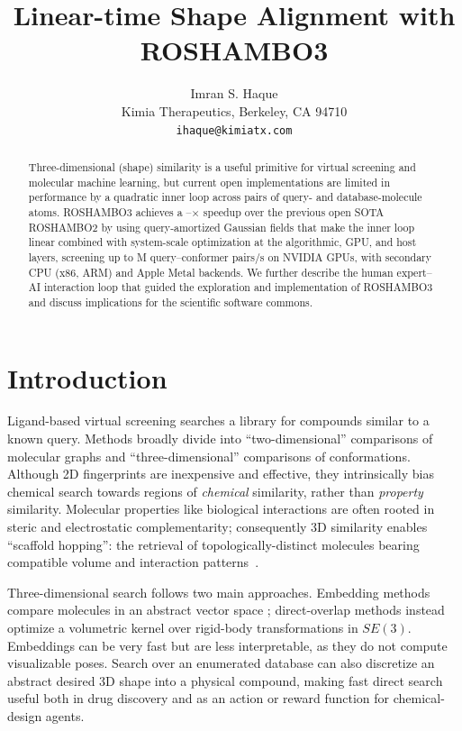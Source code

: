 \documentclass{article}
\title{Linear-time Shape Alignment with ROSHAMBO3}
\author{Imran S. Haque\\
Kimia Therapeutics, Berkeley, CA 94710\\
\texttt{ihaque@kimiatx.com}}
\newcommand{\method}{ROSHAMBO3}
\begin{document}
\maketitle
\vspace{-18pt}
\begin{abstract}
\vspace{-2pt}
    Three-dimensional (shape) similarity is a useful primitive for virtual screening
    and molecular machine learning, but current open implementations are limited in performance
    by a quadratic inner loop across pairs of query- and database-molecule atoms.
    \method{} achieves a \VoltaShapeCorrectedSpeedupWhole--\VoltaComboStockSpeedupWhole$\times$ speedup
    over the previous open SOTA ROSHAMBO2 by using query-amortized Gaussian fields that make the
    inner loop linear combined with system-scale optimization
    at the algorithmic, GPU, and host layers, screening up to \DfiveMillionEvaluationsPerSecondWhole{}M query--conformer
    pairs/s on NVIDIA GPUs, with secondary CPU (x86, ARM) and Apple Metal backends.
    We further describe the human expert--AI interaction loop that guided the exploration and
    implementation of \method{} and discuss implications for the scientific software commons.
\end{abstract}

\section{Introduction}

Ligand-based virtual screening searches a library for compounds similar to a
known query. Methods broadly divide into ``two-dimensional'' comparisons of
molecular graphs and ``three-dimensional'' comparisons of conformations.
Although 2D fingerprints are
inexpensive and effective, they intrinsically bias chemical search towards
regions of \emph{chemical} similarity, rather than \emph{property} similarity.
Molecular properties like biological interactions are often rooted in
steric and electrostatic complementarity; consequently 3D similarity
enables ``scaffold hopping'': the retrieval of topologically-distinct molecules
bearing compatible volume and interaction patterns~\citep{rush2005scaffold}.

Three-dimensional search follows two main approaches. Embedding methods compare
molecules in an abstract vector space
\citep{haque2010scissors,schreyer2012usrcat,atsango2022molclass,winter2026sand};
direct-overlap methods instead optimize a volumetric kernel over rigid-body
transformations in $SE(3)$. Embeddings can be very fast but are less interpretable, as they do not compute visualizable poses.
Search over an enumerated database can also discretize an abstract desired 3D
shape into a physical compound, making fast direct search useful both in drug
discovery and as an action or reward function for chemical-design agents.
\end{document}
